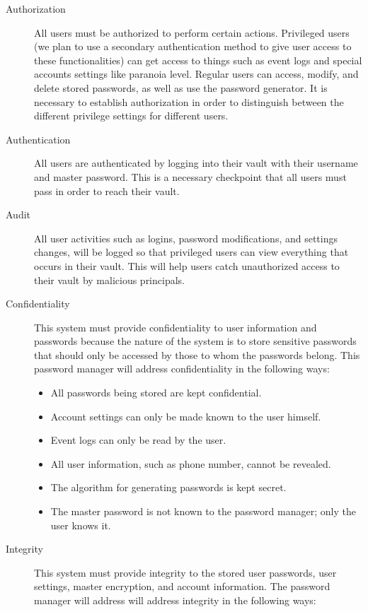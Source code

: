 \documentclass{article}
\begin{document}
\begin{description}
  \item[Authorization] All users must be authorized to perform certain actions. Privileged users (we plan to use a secondary authentication method to give user access to these functionalities) can get access to things such as event logs and special accounts settings like paranoia level. Regular users can access, modify, and delete stored passwords, as well as use the password generator. It is necessary to establish authorization in order to distinguish between the different privilege settings for different users.
  \item[Authentication] All users are authenticated by logging into their vault with their username and master password. This is a necessary checkpoint that all users must pass in order to reach their vault.
  \item[Audit] All user activities such as logins, password modifications, and settings changes, will be logged so that privileged users can view everything that occurs in their vault. This will help users catch unauthorized access to their vault by malicious principals.
  \item[Confidentiality] This system must provide confidentiality to user information and passwords because the nature of the system is to store sensitive passwords that should only be accessed by those to whom the passwords belong. This password manager will address confidentiality in the following ways: \begin{itemize}
    \item All passwords being stored are kept confidential.
    \item Account settings can only be made known to the user himself.
    \item Event logs can only be read by the user.
    \item All user information, such as phone number, cannot be revealed.
    \item The algorithm for generating passwords is kept secret.
    \item The master password is not known to the password manager; only the user knows it.
  \end{itemize}
  \item[Integrity] This system must provide integrity to the stored user passwords, user settings, master encryption, and account information. The password manager will address will address integrity in the following ways:
    \begin{itemize}

\end{itemize}
\end{description}
\end{document}
